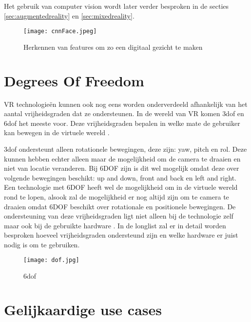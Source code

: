 Het gebruik van computer vision wordt later verder besproken in de secties \ref{sec:augmentedreality} en \ref{sec:mixedreality}. %
\begin{figure}
    \texttt{[image: cnnFace.jpeg]}
    \caption{Herkennen van features om zo een digitaal gezicht te maken}
    \label{fig:cnnface}
\end{figure}

\section{Degrees Of Freedom}

VR technologieën kunnen ook nog eens worden onderverdeeld afhankelijk van het aantal vrijheidsgraden dat ze ondersteunen. In de wereld van VR komen \acrshort{3dof} en \acrshort{6dof} het meeste voor. Deze vrijheidsgraden bepalen in welke mate de gebruiker kan bewegen in de virtuele wereld \autocite{Chen1995}.

\acrshort{3dof} ondersteunt alleen rotationele bewegingen, deze zijn: yaw, pitch en rol. Deze kunnen hebben echter alleen maar de mogelijkheid om de camera te draaien en niet van locatie veranderen. Bij 6DOF zijn is dit wel mogelijk omdat deze over volgende bewegingen beschikt: up and down, front and back en left and right.
Een technologie met 6DOF heeft wel de mogelijkheid om in de virtuele wereld rond te lopen, alsook zal de mogelijkheid er nog altijd zijn om te camera te draaien omdat 6DOF beschikt over rotationale en positionele bewegingen. De ondersteuning van deze vrijheidsgraden ligt niet alleen bij de technologie zelf maar ook bij de gebruikte hardware \autocite{Chen1995}. In de longlist zal er in detail worden besproken hoeveel vrijheidsgraden ondersteund zijn en welke hardware er juist nodig is om te gebruiken.

\begin{figure}
    \texttt{[image: dof.jpg]}
    \caption{\acrfull{6dof}}
    \label{fig:dof}
\end{figure}


\section{Gelijkaardige use cases}
